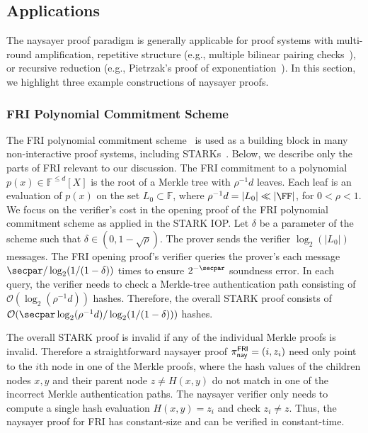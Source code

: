 \subsection{Applications}\label{sec:naysayer_apps}

The naysayer proof paradigm is generally applicable for proof systems with multi-round amplification, repetitive structure (e.g., multiple bilinear pairing checks~\cite{EPRINT:GabWilCio19}), or recursive reduction (e.g., Pietrzak's proof of exponentiation~\cite{ITCS:Pietrzak19b}). In this section, we highlight three example constructions of naysayer proofs.

\subsubsection{FRI Polynomial Commitment Scheme}\label{sec:fri_example}

The FRI polynomial commitment scheme~\cite{EPRINT:BBHR18} is used as a building block in many non-interactive proof systems, including STARKs~\cite{STOC:BCGT13}.
Below, we describe only the parts of FRI relevant to our discussion. The FRI commitment to a polynomial $p(x)\in\mathbb{F}^{\leq d}[X]$ is the root of a Merkle tree with $\rho^{-1}d$ leaves. 
Each leaf is an evaluation of $p(x)$ on the set $L_0\subset\mathbb{F}$, where $\rho^{-1}d=\vert L_0\vert\ll\vert\FF\vert$, for $0<\rho<1$. We focus on the verifier's cost in the opening proof of the FRI polynomial commitment scheme as applied in the STARK IOP. Let $\delta$ be a parameter of the scheme such that $\delta\in(0,1-\sqrt{\rho})$. The prover sends the verifier $\log_2(\vert L_0\vert)$ messages. The FRI opening proof's verifier queries the prover's each message $\secpar/\log_2(1/(1-\delta))$ times to ensure $2^{-\secpar}$ soundness error. In each query, the verifier needs to check a Merkle-tree authentication path consisting of $\mathcal{O}(\log_2(\rho^{-1}d))$ hashes. Therefore, the overall STARK proof consists of $\mathcal{O}(\secpar\log_2(\rho^{-1}d)/\log_2(1/(1-\delta)))$ hashes. 

The overall STARK proof is invalid if any of the individual Merkle proofs is invalid. Therefore a straightforward naysayer proof $\pi^{\mathsf{FRI}}_{\mathsf{nay}}=(i,z_{i})$ need only point to the $i$th node in one of the Merkle proofs, where the hash values of the children nodes $x,y$ and their parent node $z\neq H(x,y)$ do not match in one of the incorrect Merkle authentication paths. The naysayer verifier only needs to compute a single hash evaluation $H(x,y)=z_{i}$ and check $z_{i}\neq z$. Thus, the naysayer proof for FRI has constant-size and can be verified in constant-time. 


